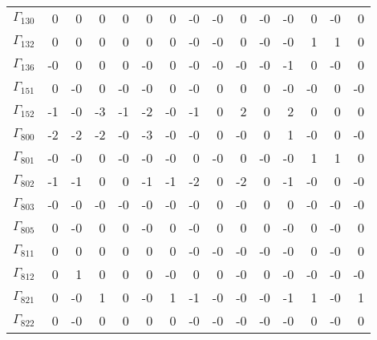{\begin{table}
\begin{center}
\else
\begin{minipage}{\linewidth}
\begin{center}
\label{tab:tau:br-fit-corr3}%
\fi
\begin{envsmall}
\begin{center}
\renewcommand*{\arraystretch}{1.1}%
\begin{tabular}{rrrrrrrrrrrrrrr}
\hline
\( \Gamma_{130} \) &    0 &    0 &    0 &    0 &    0 &    0 &   -0 &   -0 &    0 &   -0 &   -0 &    0 &   -0 &    0 \\
\( \Gamma_{132} \) &    0 &    0 &    0 &    0 &    0 &    0 &   -0 &   -0 &    0 &   -0 &   -0 &    1 &    1 &    0 \\
\( \Gamma_{136} \) &   -0 &    0 &    0 &    0 &   -0 &    0 &   -0 &   -0 &   -0 &   -0 &   -1 &    0 &   -0 &    0 \\
\( \Gamma_{151} \) &    0 &   -0 &    0 &   -0 &   -0 &    0 &   -0 &    0 &    0 &    0 &   -0 &   -0 &    0 &   -0 \\
\( \Gamma_{152} \) &   -1 &   -0 &   -3 &   -1 &   -2 &   -0 &   -1 &    0 &    2 &    0 &    2 &    0 &    0 &    0 \\
\( \Gamma_{800} \) &   -2 &   -2 &   -2 &   -0 &   -3 &   -0 &   -0 &    0 &   -0 &    0 &    1 &   -0 &    0 &   -0 \\
\( \Gamma_{801} \) &   -0 &   -0 &    0 &   -0 &   -0 &   -0 &    0 &   -0 &    0 &   -0 &   -0 &    1 &    1 &    0 \\
\( \Gamma_{802} \) &   -1 &   -1 &    0 &    0 &   -1 &   -1 &   -2 &    0 &   -2 &    0 &   -1 &   -0 &    0 &   -0 \\
\( \Gamma_{803} \) &   -0 &   -0 &   -0 &   -0 &   -0 &   -0 &   -0 &    0 &   -0 &    0 &    0 &   -0 &   -0 &   -0 \\
\( \Gamma_{805} \) &    0 &   -0 &    0 &    0 &   -0 &    0 &   -0 &    0 &    0 &    0 &   -0 &    0 &   -0 &    0 \\
\( \Gamma_{811} \) &    0 &    0 &    0 &    0 &    0 &    0 &   -0 &   -0 &   -0 &   -0 &   -0 &    0 &   -0 &    0 \\
\( \Gamma_{812} \) &    0 &    1 &    0 &    0 &    0 &   -0 &    0 &    0 &   -0 &    0 &   -0 &   -0 &   -0 &   -0 \\
\( \Gamma_{821} \) &    0 &   -0 &    1 &    0 &   -0 &    1 &   -1 &   -0 &   -0 &   -0 &   -1 &    1 &   -0 &    1 \\
\( \Gamma_{822} \) &    0 &   -0 &    0 &    0 &    0 &    0 &   -0 &   -0 &   -0 &   -0 &   -0 &    0 &   -0 &    0 \\

\end{tabular}
\end{center}
\end{envsmall}
\end{center}
\end{minipage}
\end{center}
\end{table}}
